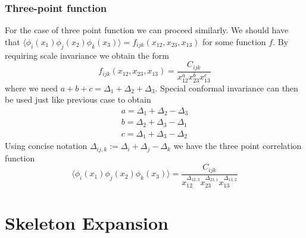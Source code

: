 \documentclass[12pt,a4paper,oneside]{book}
\theoremstyle{definition}
\begin{document}
    \subsection{Three-point function}\label{3ptfunction}
        For the case of three point function we can proceed similarly. We should have that $\langle\phi_{i}(x_1)\phi_{j}(x_2)\phi_{k}(x_3)\rangle = f_{ijk}(x_{12},x_{23},x_{13})$ for some function $f$. By requiring scale invariance we obtain the form
        \begin{equation}
            f_{ijk}(x_{12},x_{23},x_{13}) = \frac{C_{ijk}}{x_{12}^{a}x_{23}^{b}x_{13}^{c}}
        \end{equation}
        where we need $a+b+c = \Delta_1 + \Delta_2 + \Delta_3$. Special conformal invariance can then be used just like previous case to obtain 
        \begin{align*}
            a = \Delta_1 + \Delta_2 - \Delta_3\\
            b = \Delta_2+\Delta_3-\Delta_1\\
            c = \Delta_1+\Delta_3-\Delta_2
        \end{align*}
        Using concise notation $\Delta_{ij,k} := \Delta_i+\Delta_j-\Delta_k$ we have the three point correlation function
        \begin{equation}
            \langle\phi_{i}(x_1)\phi_{j}(x_2)\phi_{k}(x_3)\rangle = \frac{C_{ijk}}{x_{12}^{\Delta_{12,3}}x_{23}^{\Delta_{23,1}}x_{13}^{\Delta_{13,2}}}
        \end{equation}

\chapter{Skeleton Expansion}\label{skeleton}
\end{document}
